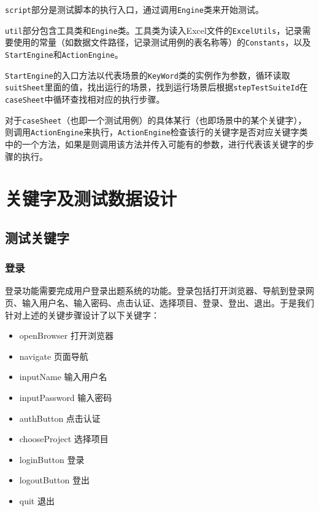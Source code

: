 \documentclass[hyperref, a4paper]{ctexart}
\providecommand{\tightlist}{%
  \setlength{\itemsep}{0pt}\setlength{\parskip}{0pt}}
\begin{document}
\texttt{script}部分是测试脚本的执行入口，通过调用\texttt{Engine}类来开始测试。

\texttt{util}部分包含工具类和\texttt{Engine}类。工具类为读入Excel文件的\texttt{ExcelUtils}，记录需要使用的常量（如数据文件路径，记录测试用例的表名称等）的\texttt{Constants}，以及\texttt{StartEngine}和\texttt{ActionEngine}。

\texttt{StartEngine}的入口方法以代表场景的\texttt{KeyWord}类的实例作为参数，循环读取\texttt{suitSheet}里面的值，找出运行的场景，找到运行场景后根据\texttt{stepTestSuiteId}在\texttt{caseSheet}中循环查找相对应的执行步骤。

对于\texttt{caseSheet}（也即一个测试用例）的具体某行（也即场景中的某个关键字），则调用\texttt{ActionEngine}来执行，\texttt{ActionEngine}检查该行的关键字是否对应关键字类中的一个方法，如果是则调用该方法并传入可能有的参数，进行代表该关键字的步骤的执行。

\hypertarget{ux5173ux952eux5b57ux53caux6d4bux8bd5ux6570ux636eux8bbeux8ba1}{%
\section{关键字及测试数据设计}\label{ux5173ux952eux5b57ux53caux6d4bux8bd5ux6570ux636eux8bbeux8ba1}}

\hypertarget{ux6d4bux8bd5ux5173ux952eux5b57}{%
\subsection{测试关键字}\label{ux6d4bux8bd5ux5173ux952eux5b57}}

\hypertarget{ux767bux5f55}{%
\subsubsection{登录}\label{ux767bux5f55}}

登录功能需要完成用户登录出题系统的功能。登录包括打开浏览器、导航到登录网页、输入用户名、输入密码、点击认证、选择项目、登录、登出、退出。于是我们针对上述的关键步骤设计了以下关键字：

\begin{itemize}
\tightlist
\item
  openBrowser 打开浏览器
\item
  navigate 页面导航
\item
  inputName 输入用户名
\item
  inputPassword 输入密码
\item
  authButton 点击认证
\item
  chooseProject 选择项目
\item
  loginButton 登录
\item
  logoutButton 登出
\item
  quit 退出
\end{itemize}
\end{document}
